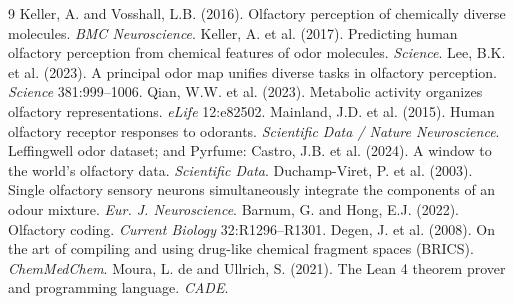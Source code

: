 \documentclass[11pt]{article}
\begin{document}
\begin{thebibliography}{9}
 Keller, A. and Vosshall, L.B. (2016). Olfactory perception of chemically
diverse molecules. \emph{BMC Neuroscience}.
 Keller, A. et al. (2017). Predicting human olfactory perception from chemical
features of odor molecules. \emph{Science}.
 Lee, B.K. et al. (2023). A principal odor map unifies diverse tasks in olfactory
perception. \emph{Science} 381:999--1006.
 Qian, W.W. et al. (2023). Metabolic activity organizes olfactory
representations. \emph{eLife} 12:e82502.
 Mainland, J.D. et al. (2015). Human olfactory receptor responses to odorants.
\emph{Scientific Data / Nature Neuroscience}.
 Leffingwell odor dataset; and Pyrfume: Castro, J.B. et al. (2024). A
window to the world's olfactory data. \emph{Scientific Data}.
 Duchamp-Viret, P. et al. (2003). Single olfactory sensory neurons
simultaneously integrate the components of an odour mixture. \emph{Eur. J. Neuroscience}.
 Barnum, G. and Hong, E.J. (2022). Olfactory coding. \emph{Current Biology}
32:R1296--R1301.
 Degen, J. et al. (2008). On the art of compiling and using drug-like chemical
fragment spaces (BRICS). \emph{ChemMedChem}.
 Moura, L. de and Ullrich, S. (2021). The Lean 4 theorem prover and programming
language. \emph{CADE}.
\end{thebibliography}
\end{document}
